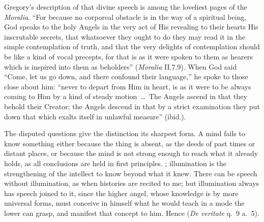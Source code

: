 Gregory's description of that divine speech is among the loveliest pages of
the \emph{Moralia}. ``For because no corporeal obstacle is in the way of a
spiritual being, God speaks to the holy Angels in the very act of His
revealing to their hearts His inscrutable secrets, that whatsoever they
ought to do they may read it in the simple contemplation of truth, and that
the very delights of contemplation should be like a kind of vocal precepts,
for that is as it were spoken to them as hearers which is inspired into
them as beholders'' (\emph{Moralia} II.7.9). When God said ``Come, let us go
down, and there confound their language,'' he spoke to those close about
him: ``never to depart from Him in heart, is as it were to be always coming
to Him by a kind of steady motion~\dots\ The Angels ascend in that they
behold their Creator; the Angels descend in that by a strict examination
they put down that which exalts itself in unlawful measure'' (ibid.).

The disputed questions give the distinction its sharpest form. A mind fails
to know something either because the thing is absent, as the deeds of past
times or distant places, or because the mind is not strong enough to reach
what it already holds, as all conclusions are held in first principles.
; illumination is
the strengthening of the intellect to know beyond what it knew. There can
be speech without illumination, as when histories are recited to me; but
illumination always has speech joined to it, since the higher angel, whose
knowledge is by more universal forms, must conceive in himself what he would
teach in a mode the lower can grasp, and manifest that concept to him. Hence
 (\emph{De veritate}
q.~9 a.~5).


